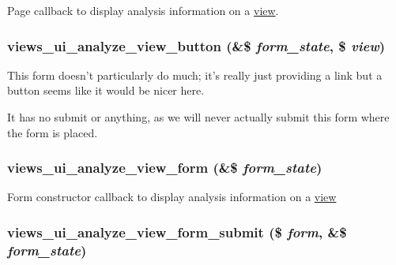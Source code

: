 Page callback to display analysis information on a \hyperlink{classview}{view}. \hypertarget{admin_8inc_001b26005a3b21e7ae5df3dc780fa556}{
\subsubsection[{views\_\-ui\_\-analyze\_\-view\_\-button}]{\setlength{\rightskip}{0pt plus 5cm}views\_\-ui\_\-analyze\_\-view\_\-button (\&\$ {\em form\_\-state}, \/  \$ {\em view})}}
\label{admin_8inc_001b26005a3b21e7ae5df3dc780fa556}


This form doesn't particularly do much; it's really just providing a link but a button seems like it would be nicer here.

It has no submit or anything, as we will never actually submit this form where the form is placed. \hypertarget{admin_8inc_09ff526ff78c7d88d2c8f599d3aef176}{
\subsubsection[{views\_\-ui\_\-analyze\_\-view\_\-form}]{\setlength{\rightskip}{0pt plus 5cm}views\_\-ui\_\-analyze\_\-view\_\-form (\&\$ {\em form\_\-state})}}
\label{admin_8inc_09ff526ff78c7d88d2c8f599d3aef176}


Form constructor callback to display analysis information on a \hyperlink{classview}{view} \hypertarget{admin_8inc_a1090e8a74ff37716f6b2365f188c73b}{
\subsubsection[{views\_\-ui\_\-analyze\_\-view\_\-form\_\-submit}]{\setlength{\rightskip}{0pt plus 5cm}views\_\-ui\_\-analyze\_\-view\_\-form\_\-submit (\$ {\em form}, \/  \&\$ {\em form\_\-state})}}
\label{admin_8inc_a1090e8a74ff37716f6b2365f188c73b}


